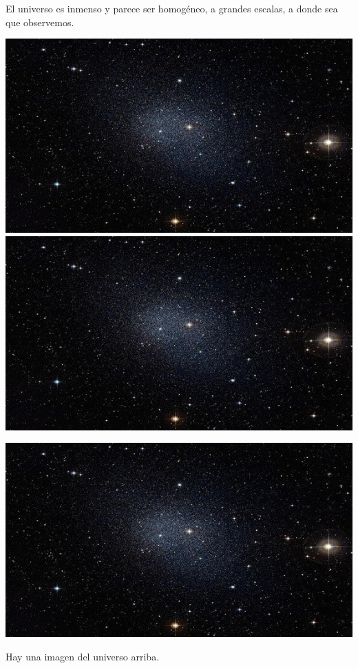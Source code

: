 \documentclass{article}
\begin{document}
El universo es inmenso y parece ser homog\'eneo, a grandes escalas, a donde sea que observemos.
 
\includegraphics{universe.jpg}
\includegraphics[scale=1]{universe.jpg}


\includegraphics[scale=0.5]{universe.jpg}

Hay una imagen del universo arriba.
\end{document}
